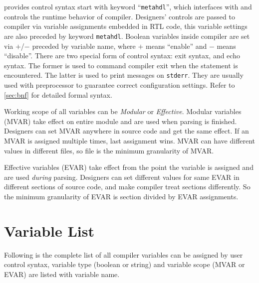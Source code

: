 \mhdl{} provides control syntax start with keyword ``\texttt{metahdl}'',
which interfaces with \mhdlc{} and controls the runtime behavior of compiler.
Designers' controls are passed to compiler via variable assignments embedded
in RTL code, this variable settings are also preceded by keyword \texttt{metahdl}.
Boolean variables inside compiler are set via $+$/$-$ preceded by variable name,
where $+$ means ``enable'' and $-$ means ``disable''.
There are two special form of control syntax: exit syntax, and echo syntax.
The former is used to command compiler exit when the statement is encountered.
The latter is used to print messages on \texttt{stderr}. They are usually used
with preprocessor to guarantee correct configuration settings.
Refer to \autoref{sec:bnf} for detailed formal syntax.

Working scope of all variables can be \emph{Modular} or \emph{Effective}.
Modular variables (MVAR) take effect on entire module and are used when parsing is finished.
Designers can set MVAR anywhere in source code and get the same
effect. If an MVAR is assigned multiple times, last assignment wins.
MVAR can have different values in different files, so file is
the minimum granularity of MVAR.

Effective variables (EVAR) take effect from the point the variable is assigned
and are used \emph{during} parsing. Designers can set different values for same EVAR in different
sections of source code, and make compiler treat sections differently. So the minimum granularity
of EVAR is section divided by EVAR assignments.

\section{Variable List}
Following is the complete list of all compiler variables can be assigned by user control
syntax, variable type (boolean or string) and variable scope (MVAR or EVAR) are listed
with variable name.

